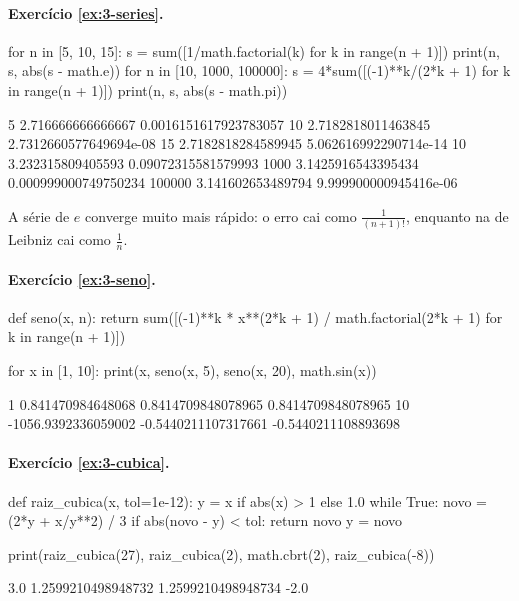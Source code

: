 \paragraph{Exercício \ref{ex:3-series}.}
\begin{entrada}
for n in [5, 10, 15]:
    s = sum([1/math.factorial(k) for k in range(n + 1)])
    print(n, s, abs(s - math.e))
for n in [10, 1000, 100000]:
    s = 4*sum([(-1)**k/(2*k + 1) for k in range(n + 1)])
    print(n, s, abs(s - math.pi))
\end{entrada}
\begin{saida}
5 2.716666666666667 0.0016151617923783057
10 2.7182818011463845 2.7312660577649694e-08
15 2.7182818284589945 5.062616992290714e-14
10 3.232315809405593 0.09072315581579993
1000 3.1425916543395434 0.000999000749750234
100000 3.141602653489794 9.999900000945416e-06
\end{saida}

A série de $e$ converge muito mais rápido: o erro cai como $\frac{1}{(n+1)!}$, enquanto na de Leibniz cai como
$\frac1n$.

\paragraph{Exercício \ref{ex:3-seno}.}
\begin{entrada}
def seno(x, n):
    return sum([(-1)**k * x**(2*k + 1) / math.factorial(2*k + 1) for k in range(n + 1)])

for x in [1, 10]:
    print(x, seno(x, 5), seno(x, 20), math.sin(x))
\end{entrada}
\begin{saida}
1 0.841470984648068 0.8414709848078965 0.8414709848078965
10 -1056.9392336059002 -0.5440211107317661 -0.5440211108893698
\end{saida}

\paragraph{Exercício \ref{ex:3-cubica}.}
\begin{entrada}
def raiz_cubica(x, tol=1e-12):
    y = x if abs(x) > 1 else 1.0
    while True:
        novo = (2*y + x/y**2) / 3
        if abs(novo - y) < tol:
            return novo
        y = novo

print(raiz_cubica(27), raiz_cubica(2), math.cbrt(2), raiz_cubica(-8))
\end{entrada}
\begin{saida}
3.0 1.2599210498948732 1.2599210498948734 -2.0
\end{saida}


